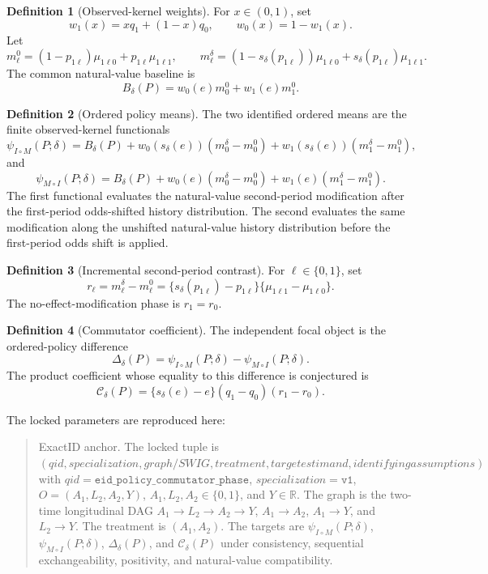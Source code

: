 \documentclass[11pt]{article}
\theoremstyle{definition}
\newtheorem{definition}{Definition}
\theoremstyle{plain}
\theoremstyle{remark}
\begin{document}
\begin{definition}[Observed-kernel weights]
For $x\in(0,1)$, set
\[
w_1(x)=xq_1+(1-x)q_0,\qquad w_0(x)=1-w_1(x).
\]
Let
\[
m_\ell^0=(1-p_{1\ell})\mu_{1\ell0}+p_{1\ell}\mu_{1\ell1},\qquad
m_\ell^\delta=(1-s_\delta(p_{1\ell}))\mu_{1\ell0}+s_\delta(p_{1\ell})\mu_{1\ell1}.
\]
The common natural-value baseline is
\[
B_\delta(P)=w_0(e)m_0^0+w_1(e)m_1^0 .
\]
\end{definition}

\begin{definition}[Ordered policy means]
The two identified ordered means are the finite observed-kernel functionals
\[
\psi_{I\circ M}(P;\delta)=B_\delta(P)+w_0(s_\delta(e))(m_0^\delta-m_0^0)+w_1(s_\delta(e))(m_1^\delta-m_1^0),
\]
and
\[
\psi_{M\circ I}(P;\delta)=B_\delta(P)+w_0(e)(m_0^\delta-m_0^0)+w_1(e)(m_1^\delta-m_1^0).
\]
The first functional evaluates the natural-value second-period modification after the first-period odds-shifted history distribution. The second evaluates the same modification along the unshifted natural-value history distribution before the first-period odds shift is applied.
\end{definition}

\begin{definition}[Incremental second-period contrast]
For $\ell\in\{0,1\}$, set
\[
r_\ell=m_\ell^\delta-m_\ell^0=\{s_\delta(p_{1\ell})-p_{1\ell}\}\{\mu_{1\ell1}-\mu_{1\ell0}\}.
\]
The no-effect-modification phase is $r_1=r_0$.
\end{definition}

\begin{definition}[Commutator coefficient]
The independent focal object is the ordered-policy difference
\[
\Delta_\delta(P)=\psi_{I\circ M}(P;\delta)-\psi_{M\circ I}(P;\delta).
\]
The product coefficient whose equality to this difference is conjectured is
\[
\mathcal C_\delta(P)=\{s_\delta(e)-e\}(q_1-q_0)(r_1-r_0).
\]
\end{definition}

The locked parameters are reproduced here:
\begin{quote}\small
ExactID anchor. The locked tuple is $(qid, specialization, graph/SWIG, treatment, target estimand, identifying assumptions)$ with $qid=\texttt{eid\_policy\_commutator\_phase}$, $specialization=\texttt{v1}$, $O=(A_1,L_2,A_2,Y)$, $A_1,L_2,A_2\in\{0,1\}$, and $Y\in\mathbb R$. The graph is the two-time longitudinal DAG $A_1\to L_2\to A_2\to Y$, $A_1\to A_2$, $A_1\to Y$, and $L_2\to Y$. The treatment is $(A_1,A_2)$. The targets are $\psi_{I\circ M}(P;\delta)$, $\psi_{M\circ I}(P;\delta)$, $\Delta_\delta(P)$, and $\mathcal C_\delta(P)$ under consistency, sequential exchangeability, positivity, and natural-value compatibility.
\end{quote}
\end{document}
